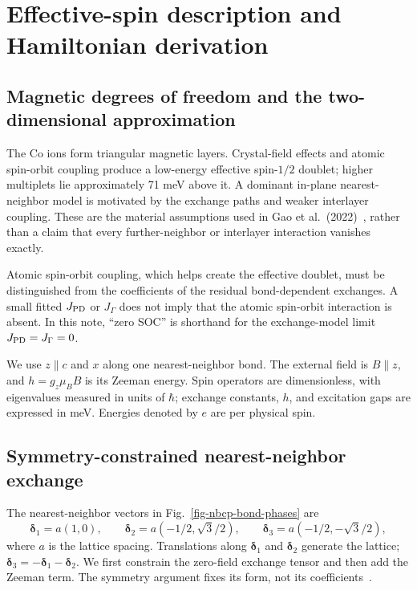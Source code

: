 \clearpage

\section{Effective-spin description and Hamiltonian derivation}\label{app-nbcp-model-derivation}

\subsection{Magnetic degrees of freedom and the two-dimensional
approximation}\label{magnetic-degrees-of-freedom-and-the-two-dimensional-approximation}

The Co ions form triangular magnetic layers. Crystal-field effects and
atomic spin-orbit coupling produce a low-energy effective spin-\(1/2\)
doublet; higher multiplets lie approximately 71 meV above it. A dominant
in-plane nearest-neighbor model is motivated by the exchange paths and
weaker interlayer coupling. These are the material assumptions used in
Gao et al.~(2022)~\cite{gao2022},
rather than a claim that every further-neighbor or interlayer
interaction vanishes exactly.

Atomic spin-orbit coupling, which helps create the effective doublet,
must be distinguished from the coefficients of the residual
bond-dependent exchanges. A small fitted \(J_{\rm PD}\) or \(J_\Gamma\)
does not imply that the atomic spin-orbit interaction is absent. In this
note, ``zero SOC'' is shorthand for the exchange-model limit
\(J_{\rm PD}=J_\Gamma=0\).

We use \(z\parallel c\) and \(x\) along one nearest-neighbor bond. The
external field is \(B\parallel z\), and \(h=g_z\mu_B B\) is its Zeeman
energy. Spin operators are dimensionless, with eigenvalues measured in
units of \(\hbar\); exchange constants, \(h\), and excitation gaps are
expressed in meV. Energies denoted by \(e\) are per physical spin.

\subsection{Symmetry-constrained nearest-neighbor
exchange}\label{symmetry-constrained-nearest-neighbor-exchange}

The nearest-neighbor vectors in Fig.~\ref{fig-nbcp-bond-phases} are
\begin{equation*}
\boldsymbol\delta_1=a(1,0),\qquad
\boldsymbol\delta_2=a(-1/2,\sqrt3/2),\qquad
\boldsymbol\delta_3=a(-1/2,-\sqrt3/2),
\end{equation*}
where \(a\) is the lattice spacing. Translations along
\(\boldsymbol\delta_1\) and \(\boldsymbol\delta_2\) generate the lattice;
\(\boldsymbol\delta_3=-\boldsymbol\delta_1-\boldsymbol\delta_2\).
We first constrain the zero-field exchange tensor and then add the Zeeman
term. The symmetry argument fixes its form, not its coefficients~\cite{park2026}.

